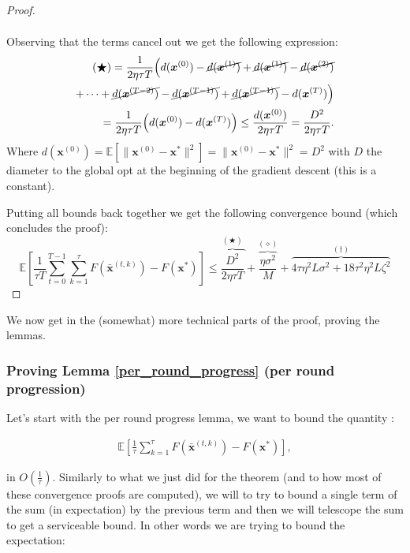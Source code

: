 \begin{proof}
\begin{enumerate}
\begin{align*}
        \end{align*}
        Observing that the terms cancel out we get the following expression: 
        \begin{align*}
        (\bigstar)= \frac{1}{2 \eta \tau T} \Big( d(\bm{x}^{(0)}) - \cancel{d(\bm{x}^{(1)})} +  \cancel{ d(\bm{x}^{(1)})} - \cancel{d(\bm{x}^{(2)})}  \\
        + \cdots + \cancel{ d(\bm{x}^{(T-2)}) } - \cancel{ d(\bm{x}^{(T-1)}) } + \cancel{ d(\bm{x}^{(T-1)}) } -  d(\bm{x}^{(T)}) \Big) \\= \frac{1}{2 \eta \tau T} \Big( d(\bm{x}^{(0)})  -  d(\bm{x}^{(T)}) \Big) \leq \frac{d(\bm{x}^{(0)})}{2 \eta \tau T} = \frac{D^2}{2 \eta \tau T} .
        \end{align*}
        Where $d(\bm{x}^{(0)}) = \mathbb{E}[\| \bm{x}^{(0)} -\bm{x}^* \|^2] = \| \bm{x}^{(0)} -\bm{x}^* \|^2 = D^2$ with $D$ the diameter to the global opt at the beginning of the gradient descent (this is a constant).
    \end{enumerate}
    Putting all bounds back together we get the following convergence bound (which concludes the proof):
    \[\mathbb{E} \left[ \frac{1}{\tau T} \sum_{t=0}^{T-1}\sum_{k=1}^{\tau} F(\bar{\bm{x}}^{(t,k)}) - F(\bm{x}^*)\right] 
    \leq \overbrace{\frac{D^2}{2 \eta \tau T} }^{(\bigstar)}+\overbrace{ \frac{\eta \sigma^2}{M}}^{(\diamond)} + \overbrace{4 \tau \eta^2 L \sigma^2 + 18 \tau^2 \eta^2 L \zeta^2}^{(\dagger)} \]
    
\end{proof}

We now get in the (somewhat) more technical parts of the proof, proving the lemmas. 

\subsubsection*{Proving Lemma \ref{per_round_progress} (per round progression)}

Let's start with the per round progress lemma, we want to bound the quantity : 

\begin{align*}
    \mathbb{E} \left[ \frac{1}{\tau} \sum_{k=1}^{\tau} F(\bar{\bm{x}}^{(t,k)}) - F(\bm{x}^*)\right],
\end{align*}

in $O(\frac{1}{\tau})$. Similarly to what we just did for the theorem (and to how most of these convergence proofs are computed), we will to try to bound a single term of the sum (in expectation) by the previous term and then we will telescope the sum to get a serviceable bound. In other words we are trying to bound the expectation: 

